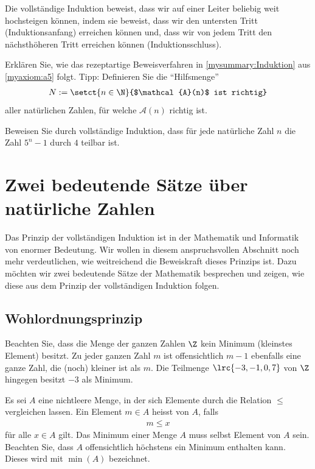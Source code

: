 \begin{myremark}
	Die vollständige Induktion beweist, dass wir auf einer Leiter beliebig weit hochsteigen können, indem sie beweist, dass wir den untersten Tritt (Induktionsanfang) erreichen
	können und, dass wir von jedem Tritt den nächsthöheren Tritt erreichen können (Induktionsschluss).
\end{myremark}

\begin{myexercise}\label{myexercise:0201}
	Erklären Sie, wie das rezeptartige Beweisverfahren in \cref{mysummary:Induktion} aus \cref{myaxiom:a5} folgt. Tipp: Definieren Sie die \enquote{Hilfsmenge}
	\begin{align*}
		N := \setct{n\in\N}{$\mathcal{A}(n)$ ist richtig}
	\end{align*}
	aller natürlichen Zahlen, für welche $\mathcal{A}(n)$ richtig ist.
\end{myexercise}

\begin{myexercise}\label{myexercise:0202}
	Beweisen Sie durch vollständige Induktion, dass für jede natürliche Zahl $n$ die Zahl $5^n-1$ durch $4$ teilbar ist.
\end{myexercise}

\section{Zwei bedeutende Sätze über natürliche Zahlen}
Das Prinzip der vollständigen Induktion ist in der Mathematik und Informatik von enormer Bedeutung. Wir wollen in diesem anspruchsvollen Abschnitt noch mehr verdeutlichen, wie weitreichend die Beweiskraft dieses Prinzips ist. Dazu möchten wir zwei bedeutende Sätze der Mathematik besprechen und zeigen, wie diese aus dem Prinzip der vollständigen Induktion folgen.
\subsection{Wohlordnungsprinzip}
Beachten Sie, dass die Menge der ganzen Zahlen $\Z$ kein Minimum (kleinstes Element) besitzt. Zu jeder ganzen Zahl $m$ ist offensichtlich $m-1$ ebenfalls eine ganze Zahl, die (noch) kleiner ist als $m$. Die Teilmenge $\lrc{-3,-1,0,7}$ von $\Z$ hingegen besitzt $-3$ als Minimum.
\begin{mydefinition}[Minimum]\label{mydefinition:min}
Es sei $A$ eine nichtleere Menge, in der sich Elemente durch die Relation $\leq$ vergleichen lassen. Ein Element $m\in A$ heisst  von $A$, falls
\begin{align*}
	m \leq x
\end{align*}
für alle $x\in A$ gilt. Das Minimum einer Menge $A$ muss selbst Element von $A$ sein. Beachten Sie, dass $A$ offensichtlich höchstens ein Minimum enthalten kann. Dieses wird mit $\min(A)$ bezeichnet.
\end{mydefinition}

